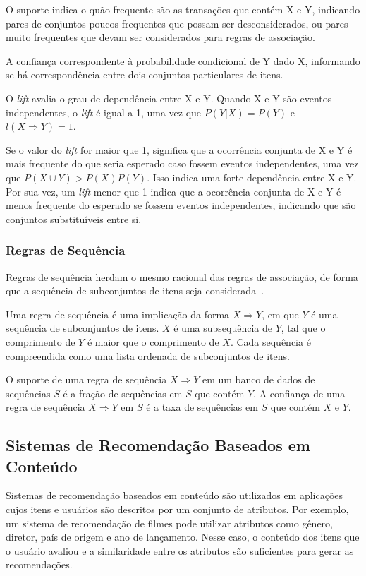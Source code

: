 O suporte indica o quão frequente são as transações que contém X e Y, indicando
pares de conjuntos poucos frequentes que possam ser desconsiderados, ou pares
muito frequentes que devam ser considerados para regras de associação.

A confiança correspondente à probabilidade condicional de Y dado X, informando
se há correspondência entre dois conjuntos particulares de itens.

O \textit{lift} avalia o grau de dependência entre X e Y. Quando X e Y são
eventos independentes, o \textit{lift} é igual a 1, uma vez que $P(Y|X) = P(Y)$ e $l(X
\Rightarrow Y) = 1$.

Se o valor do \textit{lift} for maior que 1, significa que a
ocorrência conjunta de X e Y é mais frequente do que seria esperado caso fossem
eventos independentes, uma vez que $P(X \cup Y) > P(X)P(Y)$. Isso indica uma
forte dependência entre X e Y. Por sua vez, um \textit{lift}  menor que 1 indica
que a ocorrência conjunta de X e Y é menos frequente do esperado se fossem
eventos independentes, indicando que são conjuntos substituíveis entre si.

\subsubsection{Regras de Sequência}
Regras de sequência herdam o mesmo racional das regras de associação, de forma
que a sequência de subconjuntos de itens seja considerada~\cite{liu2007web}.

Uma regra de sequência é uma implicação da forma $X \Rightarrow Y$, em que $Y$ é
uma sequência de subconjuntos de itens. $X$ é uma subsequência de $Y$, tal que o
comprimento de $Y$ é maior que o comprimento de $X$. Cada sequência é
compreendida como uma lista ordenada de subconjuntos de itens.

O suporte de uma regra de sequência $X \Rightarrow Y$ em um banco de dados de
sequências $S$ é a fração de sequências em $S$ que contém $Y$. A confiança de
uma regra de sequência $X \Rightarrow Y$ em $S$ é a taxa de sequências em
$S$ que contém $X$ e $Y$.
    
\subsection{Sistemas de Recomendação Baseados em Conteúdo}

Sistemas de recomendação baseados em conteúdo são utilizados em aplicações cujos
itens e usuários são descritos por um conjunto de atributos. Por exemplo, um
sistema de recomendação de filmes pode utilizar atributos como gênero, diretor,
país de origem e ano de lançamento. Nesse caso, o conteúdo dos itens que o
usuário avaliou e a similaridade entre os atributos são
suficientes para gerar as recomendações.

